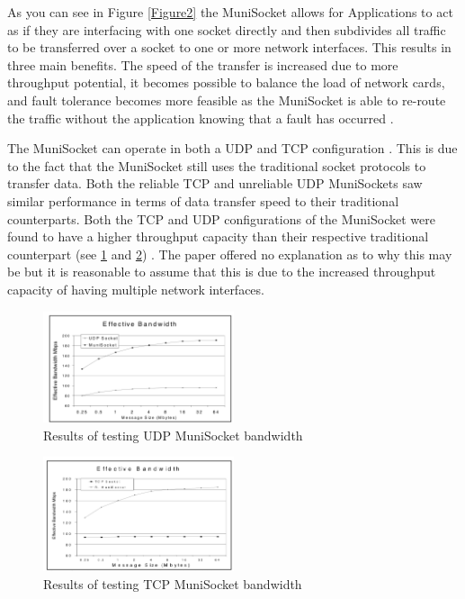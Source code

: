 \documentclass[conference, 12pt]{IEEEtran}
\begin{document}
As you can see in Figure \ref{Figure2} the MuniSocket allows for Applications to act as if they are interfacing with one socket directly and then subdivides all traffic to be transferred over a socket to one or more network interfaces. This results in three main benefits. The speed of the transfer is increased due to more throughput potential, it becomes possible to balance the load of network cards, and fault tolerance becomes more feasible as the MuniSocket is able to re-route the traffic without the application knowing that a fault has occurred \cite{Mohamed}.

The MuniSocket can operate in both a UDP and TCP configuration \cite{Mohamed}. This is due to the fact that the MuniSocket still uses the traditional socket protocols to transfer data. Both the reliable TCP and unreliable UDP MuniSockets saw similar performance in terms of data transfer speed to their traditional counterparts. Both the TCP and UDP configurations of the MuniSocket were found to have a higher throughput capacity than their respective traditional counterpart (see \ref{Figure3} and \ref{Figure4}) \cite{Mohamed}. The paper offered no explanation as to why this may be but it is reasonable to assume that this is due to the increased throughput capacity of having multiple network interfaces.

\begin{figure}[H]
    \centering
    \centerline{\includegraphics[width=0.5\textwidth]{Figure3.png}}
    \caption{Results of testing UDP MuniSocket bandwidth \cite{Mohamed}}
    \label{Figure3}
\end{figure}
\begin{figure}[t]
    \centering
    \centerline{\includegraphics[width=0.5\textwidth]{Figure4.png}}
    \caption{Results of testing TCP MuniSocket bandwidth \cite{Mohamed}}
    \label{Figure4}
\end{figure}
\end{document}
